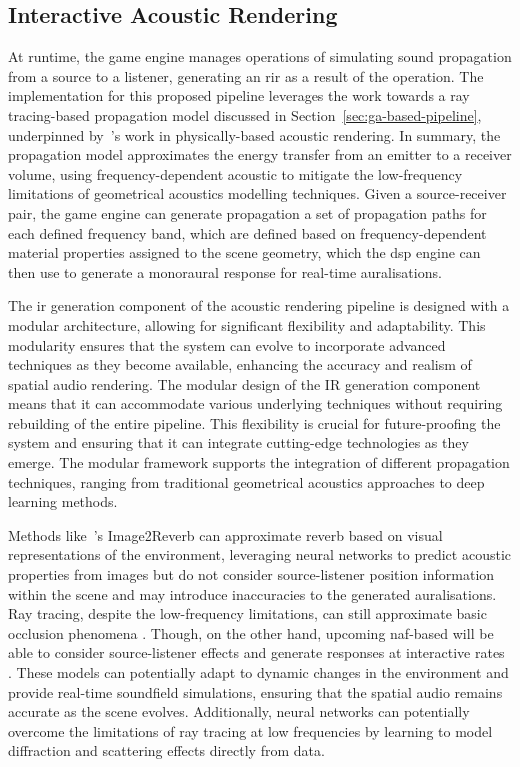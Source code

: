\subsection{Interactive Acoustic Rendering}
At runtime, the game engine manages operations of simulating sound propagation from a source to a listener, generating an \acrfull{rir} as a result of the operation. The implementation for this proposed pipeline leverages the work towards a ray tracing-based propagation model discussed in Section~\ref{sec:ga-based-pipeline}, underpinned by~\cite{schroder2011physically}'s work in physically-based acoustic rendering. In summary, the propagation model approximates the energy transfer from an emitter to a receiver volume, using frequency-dependent acoustic to mitigate the low-frequency limitations of geometrical acoustics modelling techniques. Given a source-receiver pair, the game engine can generate propagation a set of propagation paths for each defined frequency band, which are defined based on frequency-dependent material properties assigned to the scene geometry, which the \acrshort{dsp} engine can then use to generate a monoraural response for real-time auralisations.\par
The \acrshort{ir} generation component of the acoustic rendering pipeline is designed with a modular architecture, allowing for significant flexibility and adaptability. This modularity ensures that the system can evolve to incorporate advanced techniques as they become available, enhancing the accuracy and realism of spatial audio rendering. The modular design of the IR generation component means that it can accommodate various underlying techniques without requiring rebuilding of the entire pipeline. This flexibility is crucial for future-proofing the system and ensuring that it can integrate cutting-edge technologies as they emerge. The modular framework supports the integration of different propagation techniques, ranging from traditional geometrical acoustics approaches to deep learning methods.\par
Methods like~\cite{Singh_2021_ICCV}'s Image2Reverb can approximate reverb based on visual representations of the environment, leveraging neural networks to predict acoustic properties from images but do not consider source-listener position information within the scene and may introduce inaccuracies to the generated auralisations. Ray tracing, despite the low-frequency limitations, can still approximate basic occlusion phenomena \citep{savioja2015overview}. Though, on the other hand, upcoming \acrshort{naf}-based will be able to consider source-listener effects and generate responses at interactive rates \citep{luo2022learning}. These models can potentially adapt to dynamic changes in the environment and provide real-time soundfield simulations, ensuring that the spatial audio remains accurate as the scene evolves. Additionally, neural networks can potentially overcome the limitations of ray tracing at low frequencies by learning to model diffraction and scattering effects directly from data.\par

